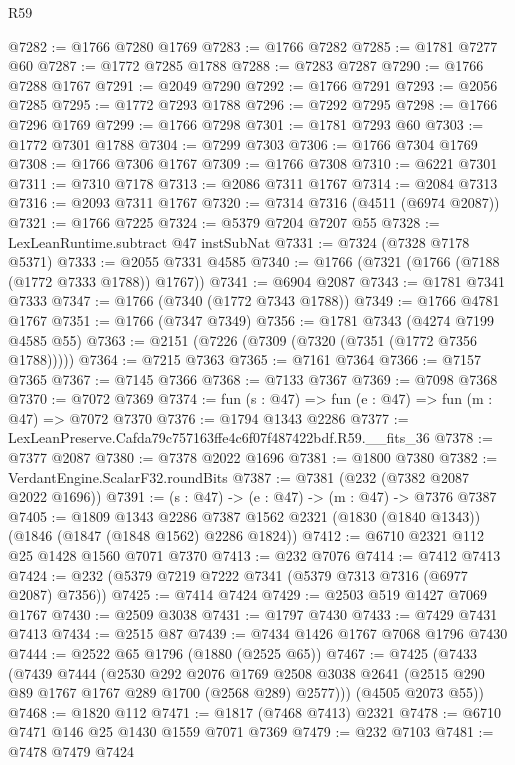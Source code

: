 \begin{lexlean}{R59}
\begin{coremodule}
@7282 := @1766 @7280 @1769
@7283 := @1766 @7282
@7285 := @1781 @7277 @60
@7287 := @1772 @7285 @1788
@7288 := @7283 @7287
@7290 := @1766 @7288 @1767
@7291 := @2049 @7290
@7292 := @1766 @7291
@7293 := @2056 @7285
@7295 := @1772 @7293 @1788
@7296 := @7292 @7295
@7298 := @1766 @7296 @1769
@7299 := @1766 @7298
@7301 := @1781 @7293 @60
@7303 := @1772 @7301 @1788
@7304 := @7299 @7303
@7306 := @1766 @7304 @1769
@7308 := @1766 @7306 @1767
@7309 := @1766 @7308
@7310 := @6221 @7301
@7311 := @7310 @7178
@7313 := @2086 @7311 @1767
@7314 := @2084 @7313
@7316 := @2093 @7311 @1767
@7320 := @7314 @7316 (@4511 (@6974 @2087))
@7321 := @1766 @7225
@7324 := @5379 @7204 @7207 @55
@7328 := LexLeanRuntime.subtract @47 instSubNat
@7331 := @7324 (@7328 @7178 @5371)
@7333 := @2055 @7331 @4585
@7340 := @1766 (@7321 (@1766 (@7188 (@1772 @7333 @1788)) @1767))
@7341 := @6904 @2087
@7343 := @1781 @7341 @7333
@7347 := @1766 (@7340 (@1772 @7343 @1788))
@7349 := @1766 @4781 @1767
@7351 := @1766 (@7347 @7349)
@7356 := @1781 @7343 (@4274 @7199 @4585 @55)
@7363 := @2151 (@7226 (@7309 (@7320 (@7351 (@1772 @7356 @1788)))))
@7364 := @7215 @7363
@7365 := @7161 @7364
@7366 := @7157 @7365
@7367 := @7145 @7366
@7368 := @7133 @7367
@7369 := @7098 @7368
@7370 := @7072 @7369
@7374 := fun (s : @47) => fun (e : @47) => fun (m : @47) => @7072 @7370
@7376 := @1794 @1343 @2286
@7377 := LexLeanPreserve.Cafda79c757163ffe4c6f07f487422bdf.R59.__fits_36
@7378 := @7377 @2087
@7380 := @7378 @2022 @1696
@7381 := @1800 @7380
@7382 := VerdantEngine.ScalarF32.roundBits
@7387 := @7381 (@232 (@7382 @2087 @2022 @1696))
@7391 := (s : @47) -> (e : @47) -> (m : @47) -> @7376 @7387
@7405 := @1809
    @1343
    @2286
    @7387
    @1562
    @2321
    (@1830 (@1840 @1343))
    (@1846 (@1847 (@1848 @1562) @2286 @1824))
@7412 := @6710 @2321 @112 @25 @1428 @1560 @7071 @7370
@7413 := @232 @7076
@7414 := @7412 @7413
@7424 := @232 (@5379 @7219 @7222 @7341 (@5379 @7313 @7316 (@6977 @2087) @7356))
@7425 := @7414 @7424
@7429 := @2503 @519 @1427 @7069 @1767
@7430 := @2509 @3038
@7431 := @1797 @7430
@7433 := @7429 @7431 @7413
@7434 := @2515 @87
@7439 := @7434 @1426 @1767 @7068 @1796 @7430
@7444 := @2522 @65 @1796 (@1880 (@2525 @65))
@7467 := @7425
    (@7433
      (@7439
        @7444
        (@2530
          @292
          @2076
          @1769
          @2508
          @3038
          @2641
          (@2515 @290 @89 @1767 @1767 @289 @1700 (@2568 @289) @2577)))
      (@4505 @2073 @55))
@7468 := @1820 @112
@7471 := @1817 (@7468 @7413) @2321
@7478 := @6710 @7471 @146 @25 @1430 @1559 @7071 @7369
@7479 := @232 @7103
@7481 := @7478 @7479 @7424

\end{coremodule}
\end{lexlean}
